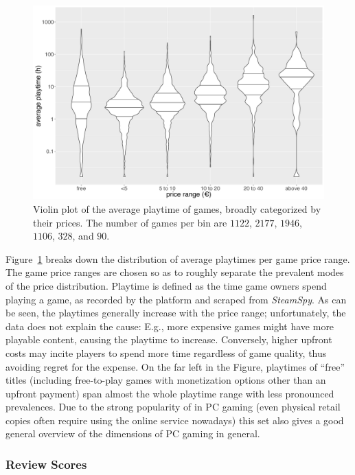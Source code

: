 \begin{figure}[!t]
	\centering
	\includegraphics[width=1.0\columnwidth]{images/steam-cost-vs-playtime-non-sale.pdf}
	\caption{Violin plot of the average playtime of \steam games, broadly categorized by their prices. The number of games per bin are $1122$, $2177$, $1946$, $1106$, $328$, and $90$.}
\label{fig:steam-cost-vs-playtime-violin}
\end{figure}

Figure~\ref{fig:steam-cost-vs-playtime-violin} breaks down the distribution of average playtimes per game price range. The game price ranges are chosen so as to roughly separate the prevalent modes of the price distribution.
Playtime is defined as the time game owners spend playing a game, as recorded by the \steam platform and scraped from \textit{SteamSpy}. As can be seen, the playtimes generally increase with the price range; unfortunately, the data does not explain the cause: E.g., more expensive games might have more playable content, causing the playtime to increase. Conversely, higher upfront costs may incite players to spend more time regardless of game quality, thus avoiding regret for the expense. On the far left in the Figure, playtimes of ``free'' titles (including free-to-play games with monetization options other than an upfront payment) span almost the whole playtime range with less pronounced prevalences.
Due to the strong popularity of \steam in PC gaming (even physical retail copies often require using the online service nowadays) this set also gives a good general overview of the dimensions of PC gaming in general.


\subsubsection{Review Scores}

